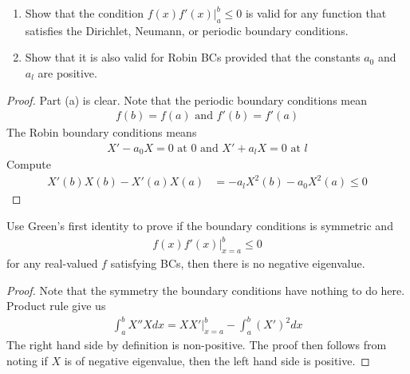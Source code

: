 \documentclass{report}
\begin{document}
\begin{question}{}{}
\begin{enumerate}[label=(\alph*)]
  \item Show that the condition $f(x)f'(x)|_a^b\leq 0$ is valid for any function that satisfies the Dirichlet, Neumann, or periodic boundary conditions. 
  \item Show that it is also valid for Robin BCs provided that the constants $a_0$ and  $a_l$ are positive. 
\end{enumerate}
\end{question}
\begin{proof}
Part (a) is clear. Note that the periodic boundary conditions mean 
\begin{align*}
f(b)=f(a)\text{ and }f'(b)=f'(a)
\end{align*}
The Robin boundary conditions means 
\begin{align*}
X'-a_0X=0 \text{ at $0$ and }X'+a_lX=0\text{ at }l
\end{align*}
Compute 
\begin{align*}
X'(b)X(b)-X'(a)X(a)&= -a_l X^2(b)-a_0X^2(a)\leq 0
\end{align*}
\end{proof}
\begin{question}{}{}
Use Green's first identity to prove if the boundary conditions is symmetric and 
\begin{align*}
f(x)f'(x)\Big|_{x=a}^b \leq 0
\end{align*}
for any real-valued $f$ satisfying BCs, then there is no negative eigenvalue.
\end{question}
\begin{proof}
Note that the symmetry the boundary conditions have nothing to do here. Product rule give us 
\begin{align*}
\int_a^b X''Xdx= XX' \Big|_{x=a}^b- \int_a^b (X')^2dx
\end{align*}
The right hand side by definition is non-positive. The proof then follows from noting if $X$ is of negative eigenvalue, then the left hand side is positive.  
\end{proof}
\end{document}
